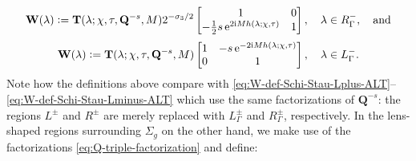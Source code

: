 \begin{equation}
\mathbf{W}(\lambda)\vcentcolon= \mathbf{T}(\lambda;\chi,\tau,\mathbf{Q}^{-s},M) 
2^{-\sigma_3/2}  \begin{bmatrix} 1 & 0 \\ -\frac{1}{2}s \,\mathrm{e}^{2\mathrm{i} M h(\lambda;\chi,\tau)} & 1 \end{bmatrix} ,\quad \lambda \in R^-_{\Gamma},\quad\text{and}
\end{equation}
\begin{equation}
\mathbf{W}(\lambda)\vcentcolon= \mathbf{T}(\lambda;\chi,\tau,\mathbf{Q}^{-s},M) 
 \begin{bmatrix} 1 & - s \,\mathrm{e}^{-2\mathrm{i} M h(\lambda;\chi,\tau)} \\ 0 & 1 \end{bmatrix} ,\quad \lambda \in L^-_{\Gamma}.
\end{equation}
Note how the definitions above compare with \eqref{eq:W-def-Schi-Stau-Lplus-ALT}--\eqref{eq:W-def-Schi-Stau-Lminus-ALT} which use the same factorizations of $\mathbf{Q}^{-s}$: the regions $L^\pm$ and $R^\pm$ are merely replaced with $L_\Gamma^\pm$ and $R_\Gamma^\pm$, respectively. In the lens-shaped regions surrounding $\Sigma_g$ on the other hand, we make use of the factorizations \eqref{eq:Q-triple-factorization} and define:
